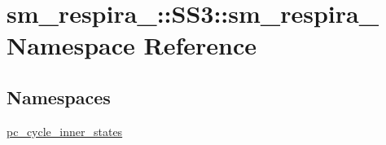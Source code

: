 \hypertarget{namespacesm__respira__1_1_1SS3_1_1sm__respira__1}{}\section{sm\+\_\+respira\+\_\+:\+:S\+S3\+:\+:sm\+\_\+respira\+\_ Namespace Reference}
\label{namespacesm__respira__1_1_1SS3_1_1sm__respira__1}
\subsection*{Namespaces}
\begin{DoxyCompactItemize}
\item 
 \hyperlink{namespacesm__respira__1_1_1SS3_1_1sm__respira__1_1_1pc__cycle__inner__states}{pc\+\_\+cycle\+\_\+inner\+\_\+states}
\end{DoxyCompactItemize}
